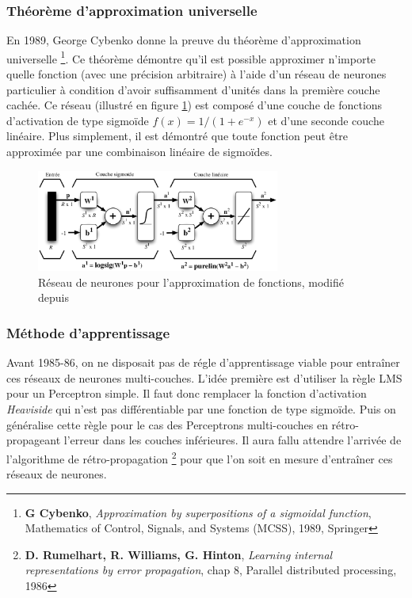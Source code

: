 \subsubsection{Théorème d'approximation universelle \label{univ}}

En 1989, George Cybenko donne la preuve du théorème d'approximation universelle
\cite{universelle}\footnote{\textbf{G Cybenko}, \textit{Approximation by
superpositions of a sigmoidal function}, Mathematics of Control, Signals, and
Systems (MCSS), 1989, Springer}. Ce théorème démontre qu'il est possible
approximer n'importe quelle fonction (avec une précision arbitraire) à l'aide
d'un réseau de neurones particulier à condition d'avoir suffisamment d'unités
dans la première couche cachée. Ce réseau (illustré en figure \ref{fig:approx})
est composé d'une couche de fonctions d'activation de type sigmoïde
$f(x)=1/(1+e^{-x})$ et d'une seconde couche linéaire. Plus simplement, il est
démontré que toute fonction peut être approximée par une combinaison linéaire
de sigmoïdes.  \\

\begin{figure}[!h]
\begin{center}
\includegraphics[width=8cm]{predoc/images/approx.eps}
\end{center}
\caption{\label{fig:approx} Réseau de neurones pour l'approximation de fonctions, modifié depuis \cite{parizeau}}
\end{figure}

\subsubsection{Méthode d'apprentissage}

Avant 1985-86, on ne disposait pas de régle d'apprentissage viable pour
entraîner ces réseaux de neurones multi-couches. L'idée première est d'utiliser
la règle LMS pour un Perceptron simple. Il faut donc remplacer la fonction
d'activation \textit{Heaviside} qui n'est pas différentiable par une fonction
de type sigmoïde. Puis on généralise cette règle pour le cas des Perceptrons
multi-couches en rétro-propageant l'erreur dans les couches inférieures. Il
aura fallu attendre l'arrivée de l'algorithme de rétro-propagation
\cite{rumel}\footnote{\textbf{D. Rumelhart, R. Williams, G. Hinton},
\textit{Learning internal representations by error propagation}, chap 8,
Parallel distributed processing, 1986} pour que l'on soit en mesure d'entraîner
ces réseaux de neurones.

